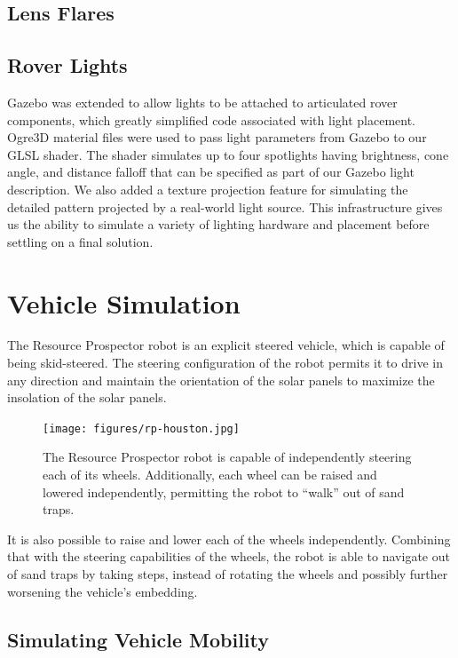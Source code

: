 \documentclass[twocolumn,letterpaper]{IEEEAerospaceCLS}  %
\begin{document}
\subsection{Lens Flares}


\subsection{Rover Lights}
Gazebo was extended to allow lights to be attached to articulated rover components, which greatly simplified code associated with light placement. 
Ogre3D material files were used to pass light parameters from Gazebo to our GLSL shader. 
The shader simulates up to four spotlights having brightness, cone angle, and distance falloff that can be specified as part of our Gazebo light description.
We also added a texture projection feature for simulating the detailed pattern projected by a real-world light source. 
This infrastructure gives us the ability to simulate a variety of lighting hardware and placement before settling on a final solution. 

\section{Vehicle Simulation}

The Resource Prospector robot is an explicit steered vehicle, which is capable of being skid-steered. 
The steering configuration of the robot permits it to drive in any direction and maintain the orientation of the solar panels to maximize the insolation of the solar panels.  

\begin{figure}[htp!]
\centering
\texttt{[image: figures/rp-houston.jpg]}
\caption{The Resource Prospector robot is capable of independently steering each of its wheels.  
Additionally, each wheel can be raised and lowered independently, permitting the robot to ``walk'' out of sand traps.  \label{fig:rp-houston}}
\end{figure}

It is also possible to raise and lower each of the wheels independently. 
Combining that with the steering capabilities of the wheels, the robot is able to navigate out of sand traps by taking steps, instead of rotating the wheels and possibly further worsening the vehicle's embedding.

\subsection{Simulating Vehicle Mobility}
\label{sec:simulated-rover}
\end{document}
